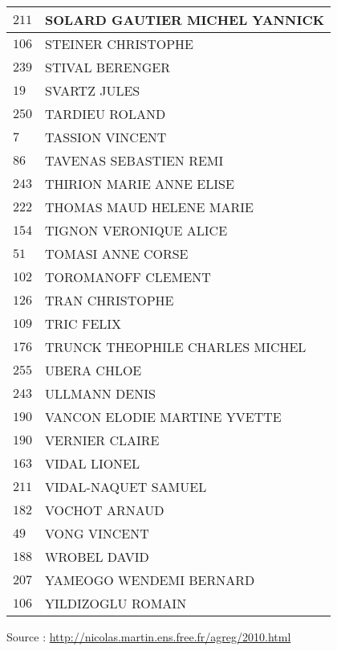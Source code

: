 \begin{xltabular}{\linewidth}{|l|X|}
    \hline
    $211$ & SOLARD GAUTIER MICHEL YANNICK \\
    \hline
    $106$ & STEINER CHRISTOPHE \\
    \hline
    $239$ & STIVAL BERENGER \\
    \hline
    $19$ & SVARTZ JULES \\
    \hline
    $250$ & TARDIEU ROLAND \\
    \hline
    $7$ & TASSION VINCENT \\
    \hline
    $86$ & TAVENAS SEBASTIEN REMI \\
    \hline
    $243$ & THIRION MARIE ANNE ELISE \\
    \hline
    $222$ & THOMAS MAUD HELENE MARIE \\
    \hline
    $154$ & TIGNON VERONIQUE ALICE \\
    \hline
    $51$ & TOMASI ANNE CORSE \\
    \hline
    $102$ & TOROMANOFF CLEMENT \\
    \hline
    $126$ & TRAN CHRISTOPHE \\
    \hline
    $109$ & TRIC FELIX \\
    \hline
    $176$ & TRUNCK THEOPHILE CHARLES MICHEL \\
    \hline
    $255$ & UBERA CHLOE \\
    \hline
    $243$ & ULLMANN DENIS \\
    \hline
    $190$ & VANCON ELODIE MARTINE YVETTE \\
    \hline
    $190$ & VERNIER CLAIRE \\
    \hline
    $163$ & VIDAL LIONEL \\
    \hline
    $211$ & VIDAL-NAQUET SAMUEL \\
    \hline
    $182$ & VOCHOT ARNAUD \\
    \hline
    $49$ & VONG VINCENT \\
    \hline
    $188$ & WROBEL DAVID \\
    \hline
    $207$ & YAMEOGO WENDEMI BERNARD \\
    \hline
    $106$ & YILDIZOGLU ROMAIN \\
    \hline
  \end{xltabular}

  \begin{flushright}
    {\tiny Source : \url{http://nicolas.martin.ens.free.fr/agreg/2010.html}}
  \end{flushright}

